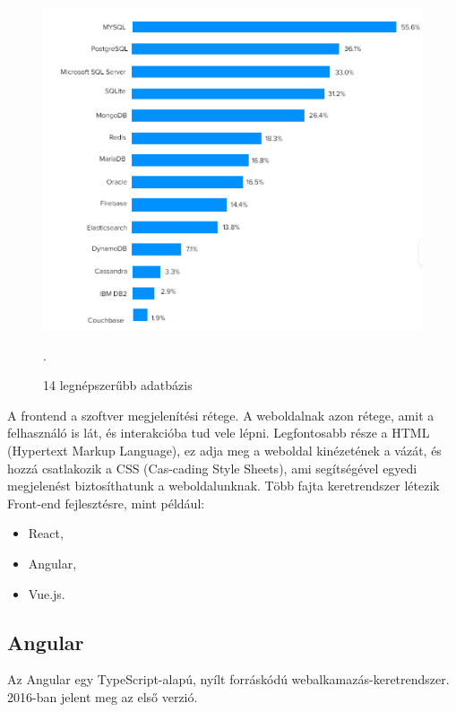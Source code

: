 \begin{figure}[h]
\centering
\includegraphics[scale=0.6]{images/top14_database.png}
\caption{14 legnépszerűbb adatbázis\cite{databases}}.
\label{fig:Adatbázisok}
\end{figure}
\newpage


A frontend a szoftver megjelenítési rétege. A weboldalnak azon rétege, amit a felhasználó is lát, és interakcióba tud vele lépni. Legfontosabb része a HTML (Hypertext Markup Language), ez adja meg a weboldal kinézetének a vázát, és hozzá csatlakozik a CSS (Cas-cading Style Sheets), ami segítségével egyedi megjelenést biztosíthatunk a weboldalunknak. Több fajta keretrendszer létezik Front-end fejlesztésre, mint például:

\begin{itemize}
\item React,
\item Angular,
\item Vue.js.
\end{itemize}


\subsection{Angular}

Az Angular egy TypeScript-alapú, nyílt forráskódú webalkamazás-keretrendszer. 2016-ban jelent meg az első verzió.

